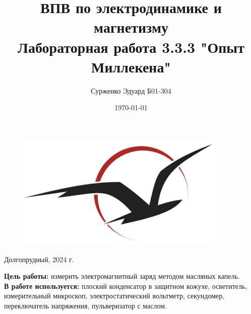 \documentclass[a4paper,12pt]{article} %
\date{\today}
\begin{document}
\begin{titlepage}
\centering    
\begin{figure}[t]
\centering
\includegraphics[width=100mm]{frtk-label 2.jpg}
\label{frkt-label.jpg}
\end{figure}

\author{Сурженко Эдуард Б01-304}
\title{ВПВ по электродинамике и магнетизму \\
Лабораторная работа 3.3.3 "Опыт Миллекена"}
\date{}
\maketitle
\thispagestyle{empty}
\vfill
Долгопрудный, 2024 г.

\end{titlepage}
\newpage

\textbf{Цель работы:} 
измерить электромагнитный заряд методом масляных капель.
\\
  

\textbf{В работе используется:} плоский конденсатор в защитном кожухе, осветитель, измерительный микроскоп, электростатический вольтметр, секундомер, переключатель напряжения, пульверизатор с маслом. 
\end{document}

